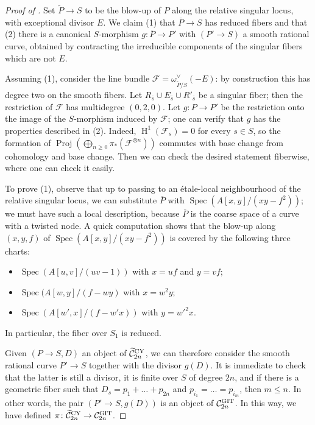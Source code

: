 \documentclass{amsart}
\newcommand{\oH}{\operatorname{H}}
\newcommand{\cC}{\mathcal{C}}
\newcommand{\cF}{\mathcal{F}}
\newcommand{\spec}{\operatorname{Spec}}
\newcommand{\Proj}{\operatorname{Proj}}
\newcommand{\Ctilde}{\widetilde{\mathcal{C}}}
\newcommand{\git}{{\rm GIT}}
\newcommand{\CY}{{\rm CY}}
\theoremstyle{definition}
\theoremstyle{definition}
\begin{document}
{\begin{proof}[Proof of ]
    Set $\widetilde{P}\to S$ to be the blow-up of $P$ along the relative singular locus, with exceptional divisor $E$. We claim (1) that $\overline{P}\to S$ has reduced fibers and that (2) there is a canonical $S$-morphism $g\colon\overline{P} \to P'$ with $(P'\to S)$ a smooth rational curve, obtained by contracting the irreducible components of the singular fibers which are not $E$.

    Assuming (1), consider the line bundle $\cF=\omega_{\widetilde{P}/S}^\vee(-E)$: by construction this has degree two on the smooth fibers. Let $R_{\overline{s}} \cup E_{\overline{s}} \cup R'_{\overline{s}}$ be a singular fiber; then the restriction of $\cF$ has multidegree $(0,2,0)$. Let $g\colon P\to P'$ be the restriction onto the image of the $S$-morphism induced by $\cF$; one can verify that $g$ has the properties described in (2). Indeed, $\oH^1(\cF_s)=0$ for every $s\in S$, so the formation of $\Proj(\bigoplus_{n\ge 0}\pi_*(\cF^{\otimes n}))$ commutes with base change from cohomology and base change. Then we can check the desired statement fiberwise, where one can check it easily.

    To prove (1), observe that up to passing to an \'{e}tale-local neighbourhood of the relative singular locus, we can substitute $\overline{P}$ with $\spec(A[x,y]/(xy-f^2))$; we must have such a local description, because $\overline{P}$ is the coarse space of a curve with a twisted node.
    A quick computation shows that the blow-up along $(x,y,f)$ of $\spec(A[x,y]/(xy-f^2))$ is covered by the following three charts:
    \begin{itemize}
        \item[(i)] $\spec(A[u,v]/(uv-1))$ with $x=uf$ and $y=vf$;
        \item[(ii)]$\spec(A[w,y]/(f-wy)$ with $x=w^2y$;
        \item [(iii)] $\spec(A[w',x]/(f-w'x))$ with $y=w'^2x$.
    \end{itemize}
    In particular, the fiber over $S_1$ is reduced.

    Given $(P\to S, D)$ an object of $\Ctilde^{\CY}_{2n}$, we can therefore consider the smooth rational curve $P'\to S$ together with the divisor $g(D)$. It is immediate to check that the latter is still a divisor, it is finite over $S$ of degree $2n$, and if there is a geometric fiber such that $D_s=p_1+\ldots +p_{2n}$ and $p_{i_1}=\ldots=p_{i_m}$, then $m\leq n$. In other words, the pair $(P'\to S, g(D))$ is an object of $\cC^{\git}_{2n}$. In this way, we have defined $\pi\colon \Ctilde^{\CY}_{2n} \to \cC^{\git}_{2n}$.


\end{proof}}
\end{document}
